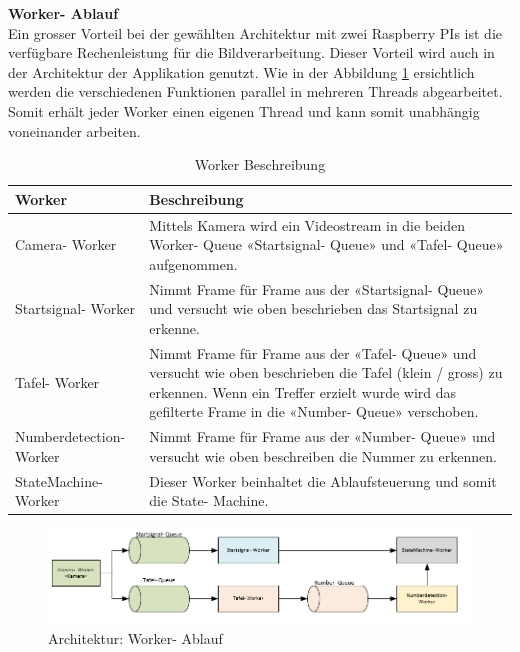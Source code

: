 \documentclass[../../main.tex]{subfiles}
\begin{document}
\newpage

\textbf{Worker- Ablauf}\\
Ein grosser Vorteil bei der gewählten Architektur mit zwei Raspberry PIs ist die verfügbare Rechenleistung für die Bildverarbeitung. Dieser Vorteil wird auch in der Architektur der Applikation genutzt. Wie in der Abbildung \ref{fig:worker-ablauf} ersichtlich werden die verschiedenen Funktionen parallel in mehreren Threads abgearbeitet. Somit erhält jeder Worker einen eigenen Thread und kann somit unabhängig voneinander arbeiten. \\

\begin{table}[H] %
  \begin{flushleft}
      \begin{tabular}{ | p{4cm} | p{10cm} |}
          \hline
          \textbf{Worker}  & \textbf{Beschreibung} \\\hline
          Camera- Worker          & Mittels Kamera wird ein Videostream in die beiden Worker- Queue «Startsignal- Queue» und «Tafel- Queue» aufgenommen. \\\hline
          Startsignal- Worker     & Nimmt Frame für Frame aus der «Startsignal- Queue» und versucht wie oben beschrieben das Startsignal zu erkenne.\\\hline
          Tafel- Worker & Nimmt Frame für Frame aus der «Tafel- Queue» und versucht wie oben beschrieben die Tafel (klein / gross) zu erkennen. Wenn ein Treffer erzielt wurde wird das gefilterte Frame in die «Number- Queue» verschoben.\\\hline
          Numberdetection- Worker & Nimmt Frame für Frame aus der «Number- Queue» und versucht wie oben beschreiben die Nummer zu erkennen. \\\hline
          StateMachine- Worker & Dieser Worker beinhaltet die Ablaufsteuerung und somit die State- Machine.\\\hline
      \end{tabular}
  \end{flushleft}
  \caption{Worker Beschreibung}
  \label{tab:worker_beschreibung}
\end{table}


\begin{figure}[H] %
  \centering
  \includegraphics[width=1\textwidth]{worker-ablauf.png}
  \caption{Architektur: Worker- Ablauf}
  \label{fig:worker-ablauf}
\end{figure}
\end{document}
